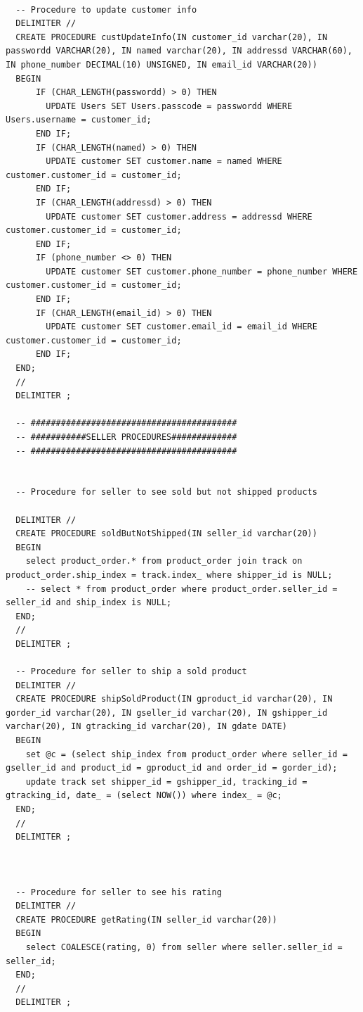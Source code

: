 \documentclass[a4paper,12pt]{article}
\begin{document}
\begin{verbatim}
  
  -- Procedure to update customer info
  DELIMITER //
  CREATE PROCEDURE custUpdateInfo(IN customer_id varchar(20), IN passwordd VARCHAR(20), IN named varchar(20), IN addressd VARCHAR(60), IN phone_number DECIMAL(10) UNSIGNED, IN email_id VARCHAR(20))
  BEGIN
      IF (CHAR_LENGTH(passwordd) > 0) THEN
        UPDATE Users SET Users.passcode = passwordd WHERE Users.username = customer_id;
      END IF;
      IF (CHAR_LENGTH(named) > 0) THEN
        UPDATE customer SET customer.name = named WHERE customer.customer_id = customer_id;
      END IF;
      IF (CHAR_LENGTH(addressd) > 0) THEN
        UPDATE customer SET customer.address = addressd WHERE customer.customer_id = customer_id;
      END IF;
      IF (phone_number <> 0) THEN
        UPDATE customer SET customer.phone_number = phone_number WHERE customer.customer_id = customer_id;
      END IF;
      IF (CHAR_LENGTH(email_id) > 0) THEN
        UPDATE customer SET customer.email_id = email_id WHERE customer.customer_id = customer_id;
      END IF;
  END;
  //
  DELIMITER ;
  
  -- #########################################
  -- ###########SELLER PROCEDURES#############
  -- #########################################
  
  
  -- Procedure for seller to see sold but not shipped products
  
  DELIMITER //
  CREATE PROCEDURE soldButNotShipped(IN seller_id varchar(20))
  BEGIN
    select product_order.* from product_order join track on product_order.ship_index = track.index_ where shipper_id is NULL;
    -- select * from product_order where product_order.seller_id = seller_id and ship_index is NULL;
  END;
  //
  DELIMITER ;
  
  -- Procedure for seller to ship a sold product
  DELIMITER //
  CREATE PROCEDURE shipSoldProduct(IN gproduct_id varchar(20), IN gorder_id varchar(20), IN gseller_id varchar(20), IN gshipper_id varchar(20), IN gtracking_id varchar(20), IN gdate DATE)
  BEGIN
    set @c = (select ship_index from product_order where seller_id = gseller_id and product_id = gproduct_id and order_id = gorder_id); 
    update track set shipper_id = gshipper_id, tracking_id = gtracking_id, date_ = (select NOW()) where index_ = @c;
  END;
  //
  DELIMITER ;
  
  
  
  -- Procedure for seller to see his rating
  DELIMITER //
  CREATE PROCEDURE getRating(IN seller_id varchar(20))
  BEGIN
    select COALESCE(rating, 0) from seller where seller.seller_id = seller_id;
  END;
  //
  DELIMITER ;
  

\end{verbatim}
\end{document}
